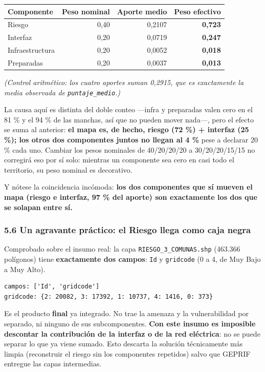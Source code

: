 \documentclass[
  spanish,
  10pt,
]{article}
\begin{document}
\begin{longtable}[]{@{}lrrr@{}}
\toprule\noalign{}
Componente & Peso nominal & Aporte medio & \textbf{Peso efectivo} \\
\midrule\noalign{}
\endhead
\bottomrule\noalign{}
\endlastfoot
Riesgo & 0,40 & 0,2107 & \textbf{0,723} \\
Interfaz & 0,20 & 0,0719 & \textbf{0,247} \\
Infraestructura & 0,20 & 0,0052 & \textbf{0,018} \\
Preparadas & 0,20 & 0,0037 & \textbf{0,013} \\
\end{longtable}

\emph{(Control aritmético: los cuatro aportes suman 0,2915, que es
exactamente la media observada de \texttt{puntaje\_medio}.)}

La causa aquí es distinta del doble conteo ---infra y preparadas valen
cero en el 81 \% y el 94 \% de las manchas, así que no pueden mover
nada---, pero el efecto se suma al anterior: \textbf{el mapa es, de
hecho, riesgo (72 \%) + interfaz (25 \%); los otros dos componentes
juntos no llegan al 4 \%} pese a declarar 20 \% cada uno. Cambiar los
pesos nominales de 40/20/20/20 a 30/20/20/15/15 no corregirá eso por sí
solo: mientras un componente sea cero en casi todo el territorio, su
peso nominal es decorativo.

Y nótese la coincidencia incómoda: \textbf{los dos componentes que sí
mueven el mapa (riesgo e interfaz, 97 \% del aporte) son exactamente los
dos que se solapan entre sí.}

\subsubsection{5.6 Un agravante práctico: el Riesgo llega como caja
negra}\label{un-agravante-pruxe1ctico-el-riesgo-llega-como-caja-negra}

Comprobado sobre el insumo real: la capa \texttt{RIESGO\_3\_COMUNAS.shp}
(463.366 polígonos) tiene \textbf{exactamente dos campos}: \texttt{Id} y
\texttt{gridcode} (0 a 4, de Muy Bajo a Muy Alto).

\begin{verbatim}
campos: ['Id', 'gridcode']
gridcode: {2: 20082, 3: 17392, 1: 10737, 4: 1416, 0: 373}
\end{verbatim}

Es el producto \textbf{final} ya integrado. No trae la amenaza y la
vulnerabilidad por separado, ni ninguno de sus subcomponentes.
\textbf{Con este insumo es imposible descontar la contribución de la
interfaz o de la red eléctrica}: no se puede separar lo que ya viene
sumado. Esto descarta la solución técnicamente más limpia (reconstruir
el riesgo sin los componentes repetidos) salvo que GEPRIF entregue las
capas intermedias.
\end{document}
